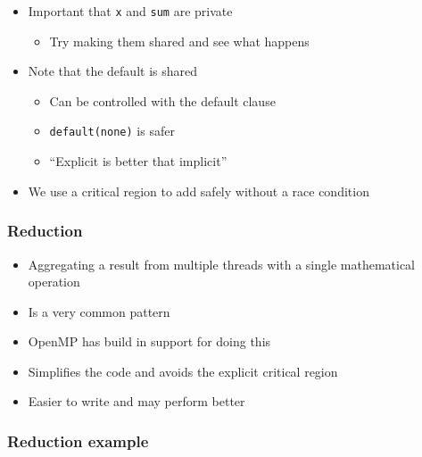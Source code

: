 \begin{itemize}
\itemsep1pt\parskip0pt
\item
  Important that \texttt{x} and \texttt{sum} are private

  \begin{itemize}
  \itemsep1pt\parskip0pt
  \item
    Try making them shared and see what happens
  \end{itemize}
\item
  Note that the default is shared

  \begin{itemize}
  \itemsep1pt\parskip0pt
  \item
    Can be controlled with the default clause
  \item
    \texttt{default(none)} is safer
  \item
    ``Explicit is better that implicit''
  \end{itemize}
\item
  We use a critical region to add safely without a race condition
\end{itemize}

\subsubsection{Reduction}\label{reduction}

\begin{itemize}
\itemsep1pt\parskip0pt
\item
  Aggregating a result from multiple threads with a single mathematical
  operation
\item
  Is a very common pattern
\item
  OpenMP has build in support for doing this
\item
  Simplifies the code and avoids the explicit critical region
\item
  Easier to write and may perform better
\end{itemize}

\subsubsection{Reduction example}\label{reduction-example}

